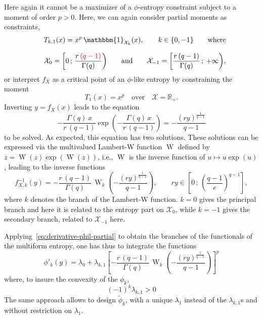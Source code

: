 \documentclass[entropy,article,submit,moreauthors,pdftex]{Definitions/mdpi}
\newcommand{\jfb}[1]{{\color{red} #1}}                                       %
\def\Rset{\mathbb{R}}%
\def\X{\mathcal{X}}%
\def\un{\mathbbm{1}}%
\def\W{\operatorname{W}} %
\begin{document}
Here again it cannot be a maximizer  of a $\phi$-entropy constraint subject to a
moment  of order  $p >  0$.   Here, we  can  again consider  partial moments  as
constraints,
%
\begin{eqnarray*}
&&  T_{k,1}(x) =  x^p  \,  \un_{\X_k}(x), \qquad  k  \in \{  0  ,  -1 \}  \qquad
  \mbox{where}   \\[2.5mm]  &&   \X_0   =  \left[   0  \,   ;   \,  \frac{r   \,
      \jfb{(q-1)}}{\Gamma(q)} \right) \qquad \mbox{and}  \qquad \X_{-1} = \left[
      \frac{r \, (q-1)}{\Gamma(q)} \, ; \: +\infty \right),
\end{eqnarray*}
%
or interpret $f_X$ as a critical point of an $\phi$-like entropy by constraining the moment 
%
\begin{equation}
T_1(x) = x^p \quad \mbox{over} \quad \X = \Rset_+.
\end{equation}
%
Inverting $y = f_X(x)$ leads to the equation
%
\[
- \frac{\Gamma(q)  \, x}{r  \, (q-1)}  \exp\left( -  \frac{\Gamma(q) \,  x}{r \,
  (q-1)} \right) = - \frac{\left( r y \right)^{\frac{1}{q-1}}}{q-1}
\]
%
to be solved. As expected, this  equation has two solutions. These solutions can
be  expressed   via  the   multivalued  Lambert-W   function  $\W$   defined  by
$z=\W(z)\exp(\W(z))$,  i.e.,  $\W$ is  the  inverse  function  of $u  \mapsto  u
\exp(u)$\cite[\S~1]{CorGon96}, leading to the inverse functions
%
\begin{equation}
f_{X,k}^{-1}(y) = - \frac{r \,  (q-1)}{\Gamma(q)} \, \W_k\left( - \frac{\left( r
  y \right)^{\frac{1}{q-1}}}{q-1}  \right) ,  \qquad r  y \in \left[  0 \,  ; \,
  \left( \frac{q-1}{e} \right)^{q-1} \right],
\end{equation}
%
where  $k$  denotes the  branch  of  the  Lambert-W  function. $k=0$  gives  the
principal branch and here it is related  to the entropy part on $\X_0$, while $k
= -1$ gives the secondary branch, related to $\X_{-1}$ here.

Applying~\eqref{eq:derivative-phil-partial}  to  obtain   the  branches  of  the
functionals of the multiform entropy, one has thus to integrate the functions
%
\[
\phi'_k(y) = \lambda_0 + \lambda_{k,1}  \left[ - \frac{r \, (q-1)}{\Gamma(q)} \,
  \W_k\left( - \frac{\left( r y \right)^{\frac{1}{q-1}}}{q-1} \right) \right]^p
\]
%
where, to insure the convexity of the $\phi_k$,
%
\[
(-1)^k \lambda_{k,1} > 0
\]
%
The  same  approach  allows  to   design  $\widetilde{\phi}_k$,  with  a  unique
$\lambda_1$  instead   of  the  $\lambda_{k,1}$s  and   without  restriction  on
$\lambda_1$.
\end{document}
